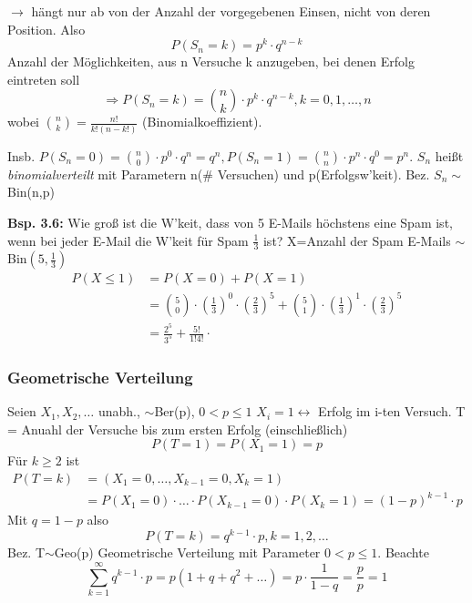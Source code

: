 \documentclass[a4paper,11pt]{article}
\begin{document}
\noindent $\rightarrow$ hängt nur ab von der Anzahl der vorgegebenen Einsen, nicht von deren Position. Also
\[P(S_n=k)=p^k \cdot q^{n-k}\]
\glqq Anzahl der Möglichkeiten, aus n Versuche k anzugeben, bei denen Erfolg eintreten soll\grqq\
\[\Rightarrow P(S_n=k)=\binom{n}{k}\cdot p^k\cdot q^{n-k}, k=0,1,\dots,n\]
wobei $\binom{n}{k}=\frac{n!}{k!(n-k!)}$ (Binomialkoeffizient).

\noindent Insb. $P(S_n=0)=\binom{n}{0}\cdot p^0\cdot q^n=q^n, P(S_n=1)=\binom{n}{n}\cdot p^n\cdot q^0=p^n$.
\newline $S_n$ heißt \textit{binomialverteilt} mit Parametern n(\# Versuchen) und p(Erfolgsw'keit).
\newline Bez. $S_n\sim$Bin(n,p)

\vspace{6pt}
\noindent\textbf{Bsp. 3.6:} Wie groß ist die W'keit, dass von 5 E-Mails höchstens eine Spam ist, wenn bei jeder E-Mail die W'keit für Spam $\frac{1}{3}$ ist?
\newline X=Anzahl der Spam E-Mails $\sim$Bin$(5,\frac{1}{3})$
\begin{align*}
P(X\leq 1) &= P(X=0)+P(X=1)\\
&= \binom{5}{0}\cdot (\frac{1}{3})^0\cdot (\frac{2}{3})^5 + \binom{5}{1}\cdot (\frac{1}{3})^1\cdot (\frac{2}{3})^5\\
&= \frac{2^5}{3^5}+\frac{5!}{1!4!}\cdot
\end{align*}

\subsubsection{Geometrische Verteilung}
Seien $X_1,X_2,\dots$ unabh., $\sim$Ber(p), $0<p\leq 1$
\newline $X_i=1 \leftrightarrow$ Erfolg im i-ten Versuch.
\newline T = Anuahl der Versuche bis zum ersten Erfolg (einschließlich)
\[P(T=1)=P(X_1=1)=p\]
\newline Für $k\geq 2$ ist
\begin{align*}
P(T=k) &= (X_1=0,\dots,X_{k-1}=0,X_k=1)\\
&= P(X_1=0)\cdot\dots\cdot P(X_{k-1}=0)\cdot P(X_k=1) = (1-p)^{k-1}\cdot p
\end{align*}
Mit $q=1-p$ also 
\[P(T=k)=q^{k-1}\cdot p, k=1,2,\dots\]
Bez. T$\sim$Geo(p) Geometrische Verteilung mit Parameter $0<p\leq1$.
\newline Beachte
\[\sum_{k=1}^{\infty}q^{k-1}\cdot p = p(1+q+q^2+\dots)=p\cdot \frac{1}{1-q}= \frac{p}{p}=1\]
\end{document}
